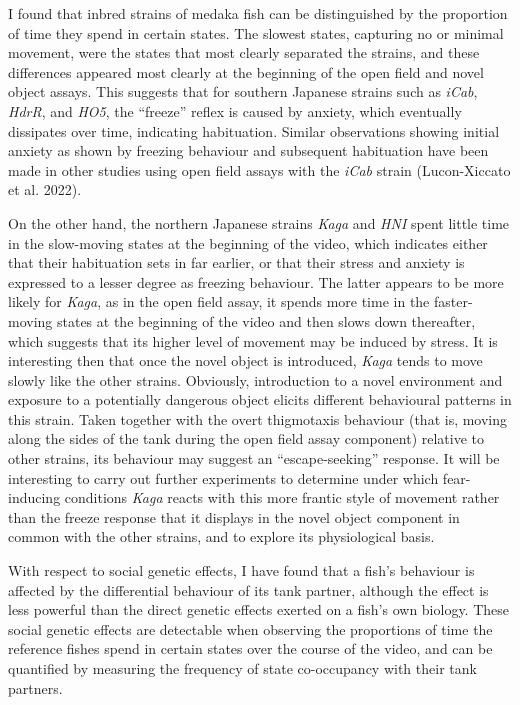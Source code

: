 \documentclass[
]{book}
\begin{document}
I found that inbred strains of medaka fish can be distinguished by the proportion of time they spend in certain states. The slowest states, capturing no or minimal movement, were the states that most clearly separated the strains, and these differences appeared most clearly at the beginning of the open field and novel object assays. This suggests that for southern Japanese strains such as \emph{iCab}, \emph{HdrR}, and \emph{HO5}, the ``freeze'' reflex is caused by anxiety, which eventually dissipates over time, indicating habituation. Similar observations showing initial anxiety as shown by freezing behaviour and subsequent habituation have been made in other studies using open field assays with the \emph{iCab} strain (Lucon-Xiccato et al. 2022).

On the other hand, the northern Japanese strains \emph{Kaga} and \emph{HNI} spent little time in the slow-moving states at the beginning of the video, which indicates either that their habituation sets in far earlier, or that their stress and anxiety is expressed to a lesser degree as freezing behaviour. The latter appears to be more likely for \emph{Kaga}, as in the open field assay, it spends more time in the faster-moving states at the beginning of the video and then slows down thereafter, which suggests that its higher level of movement may be induced by stress. It is interesting then that once the novel object is introduced, \emph{Kaga} tends to move slowly like the other strains. Obviously, introduction to a novel environment and exposure to a potentially dangerous object elicits different behavioural patterns in this strain. Taken together with the overt thigmotaxis behaviour (that is, moving along the sides of the tank during the open field assay component) relative to other strains, its behaviour may suggest an ``escape-seeking'' response. It will be interesting to carry out further experiments to determine under which fear-inducing conditions \emph{Kaga} reacts with this more frantic style of movement rather than the freeze response that it displays in the novel object component in common with the other strains, and to explore its physiological basis.

With respect to social genetic effects, I have found that a fish's behaviour is affected by the differential behaviour of its tank partner, although the effect is less powerful than the direct genetic effects exerted on a fish's own biology. These social genetic effects are detectable when observing the proportions of time the reference fishes spend in certain states over the course of the video, and can be quantified by measuring the frequency of state co-occupancy with their tank partners.
\end{document}
